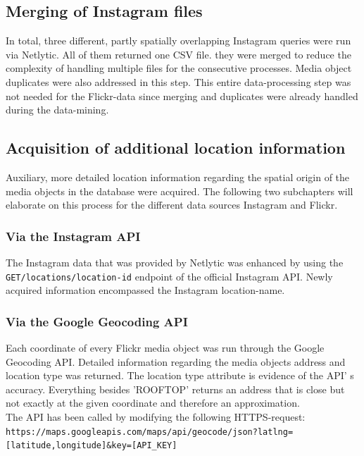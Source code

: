 \subsection{Merging of Instagram files} \label{netlytic_files_merge}
In total, three different, partly spatially overlapping Instagram queries were run via Netlytic. All of them returned one CSV file. they were merged to reduce the complexity of handling multiple files for the consecutive processes. Media object duplicates were also addressed in this step. This entire data-processing step was not needed for the Flickr-data since merging and duplicates were already handled during the data-mining.

\subsection{Acquisition of additional location information} \label{add_location_data}
Auxiliary, more detailed location information regarding the spatial origin of the media objects in the database were acquired. The following two subchapters will elaborate on this process for the different data sources Instagram and Flickr.

\subsubsection{Via the Instagram API} \label{geolocation_via_instagramapi}
The Instagram data that was provided by Netlytic was enhanced by using the \\ \texttt{GET/locations/location-id} endpoint of the official Instagram API. Newly acquired information encompassed the Instagram location-name.

\subsubsection{Via the Google Geocoding API} \label{geocoding_api}
Each coordinate of every Flickr media object was run through the Google Geocoding API. Detailed information regarding the media objects address and location type was returned. The location type attribute is evidence of the API' s accuracy. Everything besides 'ROOFTOP' returns an address that is close but not exactly at the given coordinate and therefore an approximation.\\
The API has been called by modifying the following HTTPS-request:\\
\texttt{\footnotesize{https://maps.googleapis.com/maps/api/geocode/json?latlng=[latitude,longitude]\&key=[API\_KEY]}}

